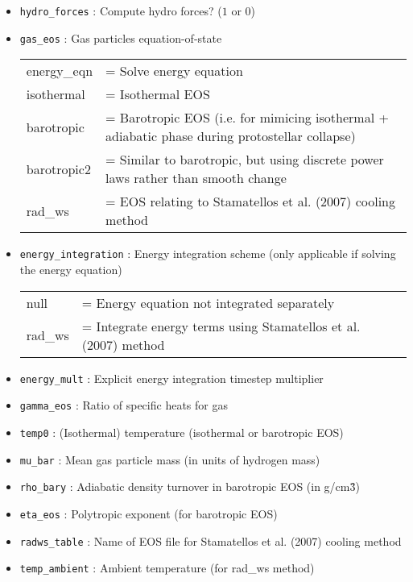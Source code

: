 \documentclass[a4paper]{article}
\newcommand{\var}[1]{\texttt{#1}}
\begin{document}
\begin{itemize}
\item \var{hydro\_forces} : Compute hydro forces?  ($1$ or $0$)

\item \var{gas\_eos} : Gas particles equation-of-state \\
\begin{tabular}{ll}
energy\_eqn & = Solve energy equation \\
isothermal  & = Isothermal EOS \\
barotropic  & = Barotropic EOS (i.e. for mimicing isothermal + adiabatic phase during protostellar collapse) \\
barotropic2  & = Similar to barotropic, but using discrete power laws rather than smooth change \\
rad\_ws     & = EOS relating to Stamatellos et al. (2007) cooling method 
\end{tabular}


\item \var{energy\_integration} : Energy integration scheme (only applicable if solving the energy equation) \\
\begin{tabular}{ll}
null        & = Energy equation not integrated separately \\
rad\_ws     & = Integrate energy terms using Stamatellos et al. (2007) method
\end{tabular}

\item \var{energy\_mult} : Explicit energy integration timestep multiplier

\item \var{gamma\_eos} : Ratio of specific heats for gas

\item \var{temp0} : (Isothermal) temperature (isothermal or barotropic EOS)

\item \var{mu\_bar}    : Mean gas particle mass (in units of hydrogen mass)

\item \var{rho\_bary} : Adiabatic density turnover in barotropic EOS (in g/cm\^3)

\item \var{eta\_eos}   : Polytropic exponent (for barotropic EOS)

\item \var{radws\_table} : Name of EOS file for Stamatellos et al. (2007) cooling method

\item \var{temp\_ambient} : Ambient temperature (for rad\_ws method)




\end{itemize}
\end{document}
